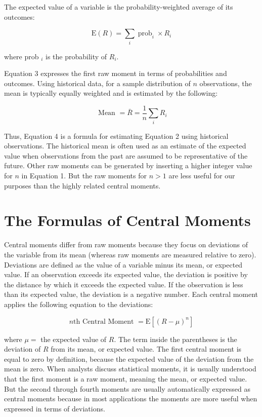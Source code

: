 \documentclass[11pt]{article}
\begin{document}
The expected value of a variable is the probability-weighted average of its outcomes:


\begin{equation*}
\mathrm{E}(R)=\sum_{i} \operatorname{prob}_{i} \times R_{i} \tag{3}
\end{equation*}


where prob $_{i}$ is the probability of $R_{i}$.

Equation 3 expresses the first raw moment in terms of probabilities and outcomes. Using historical data, for a sample distribution of $n$ observations, the mean is typically equally weighted and is estimated by the following:


\begin{equation*}
\text { Mean }=\bar{R}=\frac{1}{n} \sum_{i} R_{i} \tag{4}
\end{equation*}


Thus, Equation 4 is a formula for estimating Equation 2 using historical observations. The historical mean is often used as an estimate of the expected value when observations from the past are assumed to be representative of the future. Other raw moments can be generated by inserting a higher integer value for $n$ in Equation 1. But the raw moments for $n>1$ are less useful for our purposes than the highly related central moments.

\section*{The Formulas of Central Moments}
Central moments differ from raw moments because they focus on deviations of the variable from its mean (whereas raw moments are measured relative to zero). Deviations are defined as the value of a variable minus its mean, or expected value. If an observation exceeds its expected value, the deviation is positive by the distance by which it exceeds the expected value. If the observation is less than its expected value, the deviation is a negative number. Each central moment applies the following equation to the deviations:


\begin{equation*}
n \text {th Central Moment }=\mathrm{E}\left[(R-\mu)^{n}\right] \tag{5}
\end{equation*}


where $\mu=$ the expected value of $R$. The term inside the parentheses is the deviation of $R$ from its mean, or expected value. The first central moment is equal to zero by definition, because the expected value of the deviation from the mean is zero. When analysts discuss statistical moments, it is usually understood that the first moment is a raw moment, meaning the mean, or expected value. But the second through fourth moments are usually automatically expressed as central moments because in most applications the moments are more useful when expressed in terms of deviations.
\end{document}
